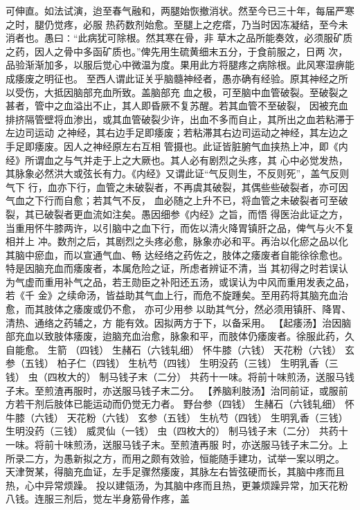 \documentclass[a4paper,12pt,UTF8,twoside]{ctexbook}
\begin{document}
可伸直。如法试演，迨至春气融和，两腿始恢撤消状。然至今已三十年，每届严寒之时，腿仍觉疼，必服 
热药数剂始愈。至腿上之疙瘩，乃当时因冻凝结，至今未消者也。愚曰∶“此病犹可除根。然其寒在骨，非 
草木之品所能奏效，必须服矿质之药，因人之骨中多函矿质也。”俾先用生硫黄细末五分，于食前服之，日两 
次，品验渐渐加多，以服后觉心中微温为度。果用此方将腿疼之病除根。此风寒湿痹能 
成痿废之明征也。 
至西人谓此证关乎脑髓神经者，愚亦确有经验。原其神经之所以受伤，大抵因脑部充血所致。盖脑部充 
血之极，可至脑中血管破裂。至破裂之甚者，管中之血溢出不止，其人即昏厥不复苏醒。若其血管不至破裂， 
因被充血排挤隔管壁将血渗出，或其血管破裂少许，出血不多而自止，其所出之血若粘滞于左边司运动 
之神经，其右边手足即痿废；若粘滞其右边司运动之神经，其左边之手足即痿废。因人之神经原左右互相 
管摄也。此证皆脏腑气血挟热上冲，即《内经》所谓血之与气并走于上之大厥也。其人必有剧烈之头疼，其 
心中必觉发热，其脉象必然洪大或弦长有力。《内经》又谓此证“气反则生，不反则死”，盖气反则气下 
行，血亦下行，血管之未破裂者，不再虞其破裂，其偶些些破裂者，亦可因气血之下行而自愈；若其气不反， 
血必随之上升不已，将血管之未破裂者可至破裂，其已破裂者更血流如注矣。愚因细参《内经》之旨，而悟 
得医治此证之方，当重用怀牛膝两许，以引脑中之血下行，而佐以清火降胃镇肝之品，俾气与火不复相并上 
冲。数剂之后，其剧烈之头疼必愈，脉象亦必和平。再治以化瘀之品以化其脑中瘀血，而以宣通气血、畅 
达经络之药佐之，肢体之痿废者自能徐徐愈也。特是因脑充血而痿废者，本属危险之证，所虑者辨证不清，当 
其初得之时若误认为气虚而重用补气之品，若王勋臣之补阳还五汤，或误认为中风而重用发表之品，若《千 
金》之续命汤，皆益助其气血上行，而危不旋踵矣。至用药将其脑充血治愈，而其肢体之痿废或仍不愈， 
亦可少用参 以助其气分，然必须用镇肝、降胃、清热、通络之药辅之，方 
能有效。因拟两方于下，以备采用。 
【起痿汤】治因脑部充血以致肢体痿废，迨脑充血治愈，脉象和平，而肢体仍痿废者。徐服此药，久自能愈。 
生箭 （四钱） 生赭石（六钱轧细） 怀牛膝（六钱） 天花粉（六钱） 
玄参（五钱） 柏子仁（四钱） 生杭芍（四钱） 生明没药（三钱） 
生明乳香（三钱） 虫（四枚大的） 制马钱子末（二分） 
共药十一味。将前十味煎汤，送服马钱子末。至煎渣再服时，亦送服马钱子末二分。 
【养脑利肢汤】治同前证，或服前方若干剂后肢体已能运动而仍觉无力者。 
野台参（四钱） 生赭石（六钱轧细） 怀牛膝（六钱） 天花粉（六钱） 
玄参（五钱） 生杭芍（四钱） 生明乳香（三钱） 生明没药（三钱） 
威灵仙（一钱） 虫（四枚大的） 制马钱子末（二分） 
共药十一味。将前十味煎汤，送服马钱子末。至煎渣再服 
时，亦送服马钱子末二分。上所录二方，为愚新拟之方，而用之颇有效验，恒能随手建功，试举一案以明之。 
天津贺某，得脑充血证，左手足骤然痿废，其脉左右皆弦硬而长，其脑中疼而且热，心中异常烦躁。 
投以建瓴汤，为其脑中疼而且热，更兼烦躁异常，加天花粉八钱。连服三剂后，觉左半身筋骨作疼，盖 
\end{document}
